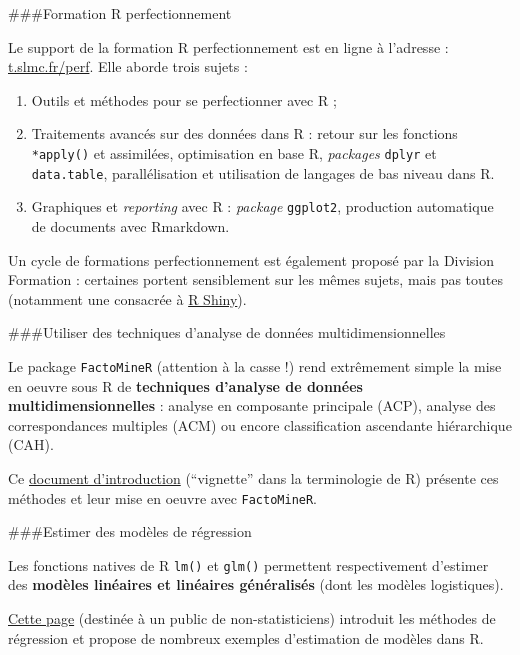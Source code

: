 \documentclass[12pt,twosided, notitlepage]{book}
\begin{document}
\#\#\#Formation R perfectionnement

Le support de la formation R perfectionnement est en ligne à l'adresse :
\href{http://teaching.slmc.fr/perf}{t.slmc.fr/perf}. Elle aborde trois
sujets :

\begin{enumerate}
\def\labelenumi{\arabic{enumi}.}
\item
  Outils et méthodes pour se perfectionner avec R ;
\item
  Traitements avancés sur des données dans R : retour sur les fonctions
  \texttt{*apply()} et assimilées, optimisation en base R,
  \emph{packages} \texttt{dplyr} et \texttt{data.table}, parallélisation
  et utilisation de langages de bas niveau dans R.
\item
  Graphiques et \emph{reporting} avec R : \emph{package}
  \texttt{ggplot2}, production automatique de documents avec Rmarkdown.
\end{enumerate}

Un cycle de formations perfectionnement est également proposé par la
Division Formation : certaines portent sensiblement sur les mêmes
sujets, mais pas toutes (notamment une consacrée à
\href{https://shiny.rstudio.com/}{R Shiny}).

\#\#\#Utiliser des techniques d'analyse de données multidimensionnelles

Le package \texttt{FactoMineR} (attention à la casse !) rend extrêmement
simple la mise en oeuvre sous R de \textbf{techniques d'analyse de
données multidimensionnelles} : analyse en composante principale (ACP),
analyse des correspondances multiples (ACM) ou encore classification
ascendante hiérarchique (CAH).

Ce
\href{https://cran.r-project.org/web/packages/FactoMineR/vignettes/FactoMineR.pdf}{document
d'introduction} (\enquote{vignette} dans la terminologie de R) présente
ces méthodes et leur mise en oeuvre avec \texttt{FactoMineR}.

\#\#\#Estimer des modèles de régression

Les fonctions natives de R \texttt{lm()} et \texttt{glm()} permettent
respectivement d'estimer des \textbf{modèles linéaires et linéaires
généralisés} (dont les modèles logistiques).

\href{http://teaching.slmc.fr/mqs2}{Cette page} (destinée à un public de
non-statisticiens) introduit les méthodes de régression et propose de
nombreux exemples d'estimation de modèles dans R.

\cleardoublepage
{}
{}
\listofcaspratique
\fancyhead{}

\printindex
\end{document}
